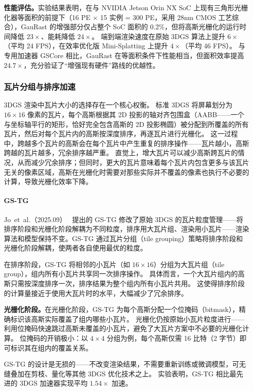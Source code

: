 \textbf{性能评估。}实验结果表明，在与 NVIDIA Jetson Orin NX SoC 上现有三角形光栅化器等面积的前提下（16 PE $\times$ 15 实例 = 300 PE，采用 28nm CMOS 工艺综合），GauRast 的增强部分仅占整个 SoC 面积的 0.2\%，但将高斯光栅化的运行时间降低 $23\times$、能耗降低 $24\times$。
端到端渲染速度在原始 3DGS 算法上提升 $6\times$（平均 24 FPS），在效率优化版 Mini-Splatting 上提升 $4\times$（平均 46 FPS）。
与专用加速器 GSCore 相比，GauRast 在等面积条件下性能相当，但面积效率提高 $24.7\times$，充分验证了“增强现有硬件”路线的优越性。

\subsubsection{瓦片分组与排序加速}

3DGS 渲染中瓦片大小的选择存在一个核心权衡。
标准 3DGS 将屏幕划分为 $16\times16$ 像素的瓦片，每个高斯根据其 2D 投影的轴对齐包围盒（AABB——一个与坐标轴平行的矩形，恰好完全包含高斯的 2D 投影椭圆）被分配到所覆盖的所有瓦片，然后对每个瓦片内的高斯按深度排序，再逐瓦片进行光栅化。
这一过程中，跨越多个瓦片的高斯会在每个瓦片中产生重复的排序操作——瓦片越小，高斯跨越的瓦片越多，冗余排序越严重。
直觉上，增大瓦片可以减少高斯跨瓦片的情况，从而减少冗余排序；但同时，更大的瓦片意味着每个瓦片内包含更多与该瓦片无关的像素区域，高斯在光栅化时需要对那些实际并不覆盖的像素也执行不必要的计算，导致光栅化效率下降。

\paragraph{GS-TG}
Jo~et~al.（2025.09）~\cite{2509_00911} 提出的 GS-TG 修改了原始 3DGS 的瓦片粒度管理——将排序阶段和光栅化阶段解耦为不同粒度，排序用大瓦片组、渲染用小瓦片——渲染算法和模型保持不变。GS-TG 通过瓦片分组（tile grouping）策略将排序阶段和光栅化阶段解耦，使两者各自使用最优的粒度。

在排序阶段，GS-TG 将相邻的小瓦片（如 $16\times16$）分组为大瓦片组（tile group），组内所有小瓦片共享同一次排序操作。
具体而言，一个大瓦片组内的高斯只需按深度排序一次，排序结果为整个组内所有小瓦片共用。
这使得排序阶段的计算量接近于使用大瓦片时的水平，大幅减少了冗余排序。

\textbf{光栅化阶段。}在光栅化阶段，GS-TG 为每个高斯分配一个位掩码（bitmask），精确标识该高斯实际覆盖了组内哪些小瓦片。
光栅化仍按原始小瓦片粒度进行——利用位掩码快速跳过高斯未覆盖的小瓦片，避免了大瓦片方案中不必要的光栅化计算。
位掩码的开销极小：以 $4\times4$ 分组为例，每个高斯仅需 16 比特（2 字节）即可标识其在组内的覆盖关系。

GS-TG 的设计是无损的——不改变渲染结果，不需要重新训练或微调模型，可无缝叠加在剪枝、量化等其他 3DGS 优化技术之上。
实验表明，GS-TG 相比最先进的 3DGS 加速器实现平均 $1.54\times$ 加速。

